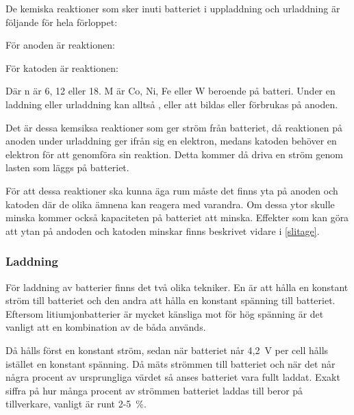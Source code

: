 \documentclass[a4paper,12pt]{article}
\begin{document}

De kemiska reaktioner som sker inuti batteriet i uppladdning och urladdning är följande för hela förloppet:

\centerline{}

För anoden är reaktionen:
\\
\centerline{}

För katoden är reaktionen:
\\
\centerline{}

Där n är 6, 12 eller 18. M är Co, Ni, Fe eller W beroende på batteri. Under en laddning eller urladdning kan alltså ,  eller  att bildas eller förbrukas på anoden. \cite{formler} 

Det är dessa kemsiksa reaktioner som ger ström från batteriet, då reaktionen på anoden under urladdning ger ifrån sig en elektron, medans katoden behöver en elektron för att genomföra sin reaktion. Detta kommer då driva en ström genom lasten som läggs på batteriet.

För att dessa reaktioner ska kunna äga rum måste det finns yta på anoden och katoden där de olika ämnena kan reagera med varandra. Om dessa ytor skulle minska kommer också kapaciteten på batteriet att minska. Effekter som kan göra att ytan på andoden och katoden minskar finns beskrivet vidare i \ref{slitage}.

\subsubsection{Laddning}
För laddning av batterier finns det två olika tekniker. En är att hålla en konstant ström till batteriet och den andra att hålla en konstant spänning till batteriet. Eftersom litiumjonbatterier är mycket känsliga mot för hög spänning är det vanligt att en kombination av de båda används.

Då hålls först en konstant ström, sedan när batteriet når 4,2~V per cell hålls istället en konstant spänning. Då mäts strömmen till batteriet och när det når några procent av ursprungliga värdet så anses batteriet vara fullt laddat. Exakt siffra på hur många procent av strömmen batteriet laddas till beror på tillverkare, vanligt är runt 2-5~\%.
\end{document}
